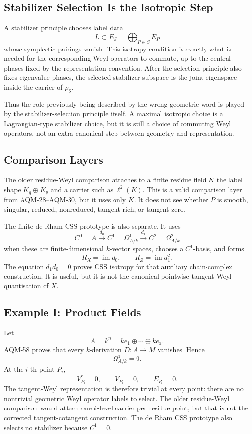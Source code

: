 \subsection{Stabilizer Selection Is the Isotropic Step}

A stabilizer principle chooses label data
\[
  L\subset E_S=\bigoplus_{P\in S}E_P
\]
whose symplectic pairings vanish.  This isotropy condition is exactly what is
needed for the corresponding Weyl operators to commute, up to the central
phases fixed by the representation convention.  After the selection principle
also fixes eigenvalue phases, the selected stabilizer subspace is the joint
eigenspace inside the carrier of \(\rho_S\).

Thus the role previously being described by the wrong geometric word is played
by the stabilizer-selection principle itself.  A maximal isotropic choice is a
Lagrangian-type stabilizer choice, but it is still a choice of commuting Weyl
operators, not an extra canonical step between geometry and representation.

\subsection{Comparison Layers}

The older residue-Weyl comparison attaches to a finite residue field \(K\) the
label shape \(K_q\oplus K_p\) and a carrier such as \(\ell^2(K)\).  This is a
valid comparison layer from AQM-28--AQM-30, but it uses only \(K\).  It does
not see whether \(P\) is smooth, singular, reduced, nonreduced, tangent-rich, or
tangent-zero.

The finite de Rham CSS prototype is also separate.  It uses
\[
  C^0=A\xrightarrow{d_0}C^1=\Omega^1_{A/k}
       \xrightarrow{d_1}C^2=\Omega^2_{A/k}
\]
when these are finite-dimensional \(k\)-vector spaces, chooses a \(C^1\)-basis,
and forms
\[
  R_X=\operatorname{im}d_0,\qquad R_Z=\operatorname{im}d_1^T.
\]
The equation \(d_1d_0=0\) proves CSS isotropy for that auxiliary
chain-complex construction.  It is useful, but it is not the canonical
pointwise tangent-Weyl quantisation of \(X\).

\subsection{Example I: Product Fields}

Let
\[
  A=k^n=k e_1\oplus\cdots\oplus k e_n .
\]
AQM-58 proves that every \(k\)-derivation \(D:A\to M\) vanishes.  Hence
\[
  \Omega^1_{A/k}=0.
\]
At the \(i\)-th point \(P_i\),
\[
  V_{P_i}^*=0,\qquad V_{P_i}=0,\qquad E_{P_i}=0.
\]
The tangent-Weyl representation is therefore trivial at every point: there are
no nontrivial geometric Weyl operator labels to select.  The older residue-Weyl
comparison would attach one \(k\)-level carrier per residue point, but that is
not the corrected tangent-cotangent construction.  The de Rham CSS prototype
also selects no stabilizer because \(C^1=0\).

